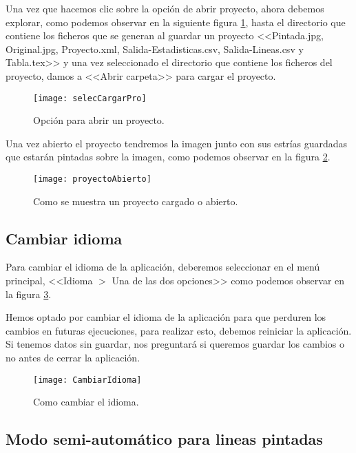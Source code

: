 Una vez que hacemos clic sobre la opción de abrir proyecto, ahora debemos explorar, como podemos observar en la siguiente figura \ref{fig:selecCargarPro}, hasta el directorio que contiene los ficheros que se generan al guardar un proyecto \textrm{<<Pintada.jpg, Original.jpg, Proyecto.xml, Salida-Estadisticas.csv, Salida-Lineas.csv y Tabla.tex>>}  y una vez seleccionado el directorio que contiene los ficheros del proyecto, damos a \textrm{<<Abrir carpeta>>} para cargar el proyecto. 



\begin{figure}[h]
\centering
\texttt{[image: selecCargarPro]}
\caption{Opción para abrir un proyecto.}
\label{fig:selecCargarPro}
\end{figure}

Una vez abierto el proyecto tendremos la imagen junto con sus estrías guardadas que estarán pintadas sobre la imagen, como podemos observar en la figura \ref{fig:proyectoAbierto}.


\begin{figure}[h]
\centering
\texttt{[image: proyectoAbierto]}
\caption{Como se muestra un proyecto cargado o abierto.}
\label{fig:proyectoAbierto}
\end{figure}

\subsection{Cambiar idioma}
\label{modo:idioma}

Para cambiar el idioma de la aplicación, deberemos seleccionar en el menú principal, <<Idioma $>$ Una de las dos opciones>> como podemos observar en la figura \ref{fig:camb}.

Hemos optado por cambiar el idioma de la aplicación para que perduren los cambios en futuras ejecuciones, para realizar esto, debemos reiniciar la aplicación. Si tenemos datos sin guardar, nos preguntará si queremos guardar los cambios o no antes de cerrar la aplicación.

\begin{figure}[h]
\centering
\texttt{[image: CambiarIdioma]}
\caption{Como cambiar el idioma.}
\label{fig:camb}
\end{figure}

\subsection{Modo semi-automático para lineas pintadas}

